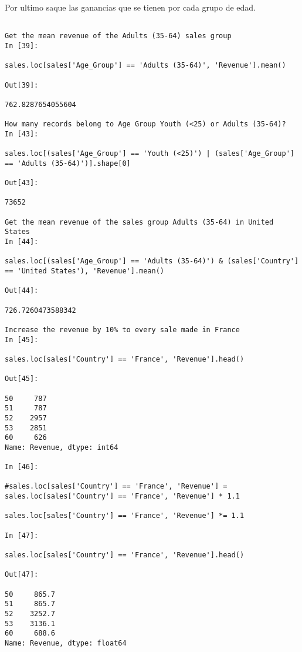 \documentclass[
	12pt, %
]{fphw}
\begin{document}
Por ultimo saque las ganancias que se tienen por cada grupo de edad.

\lstset{language=Python}
\lstset{frame=lines}
\lstset{basicstyle=\footnotesize}
\begin{lstlisting}

Get the mean revenue of the Adults (35-64) sales group
In [39]:

sales.loc[sales['Age_Group'] == 'Adults (35-64)', 'Revenue'].mean()

Out[39]:

762.8287654055604

How many records belong to Age Group Youth (<25) or Adults (35-64)?
In [43]:

sales.loc[(sales['Age_Group'] == 'Youth (<25)') | (sales['Age_Group'] == 'Adults (35-64)')].shape[0]

Out[43]:

73652

Get the mean revenue of the sales group Adults (35-64) in United States
In [44]:

sales.loc[(sales['Age_Group'] == 'Adults (35-64)') & (sales['Country'] == 'United States'), 'Revenue'].mean()

Out[44]:

726.7260473588342

Increase the revenue by 10% to every sale made in France
In [45]:

sales.loc[sales['Country'] == 'France', 'Revenue'].head()

Out[45]:

50     787
51     787
52    2957
53    2851
60     626
Name: Revenue, dtype: int64

In [46]:

#sales.loc[sales['Country'] == 'France', 'Revenue'] = sales.loc[sales['Country'] == 'France', 'Revenue'] * 1.1

sales.loc[sales['Country'] == 'France', 'Revenue'] *= 1.1

In [47]:

sales.loc[sales['Country'] == 'France', 'Revenue'].head()

Out[47]:

50     865.7
51     865.7
52    3252.7
53    3136.1
60     688.6
Name: Revenue, dtype: float64


\end{lstlisting}


\end{document}
